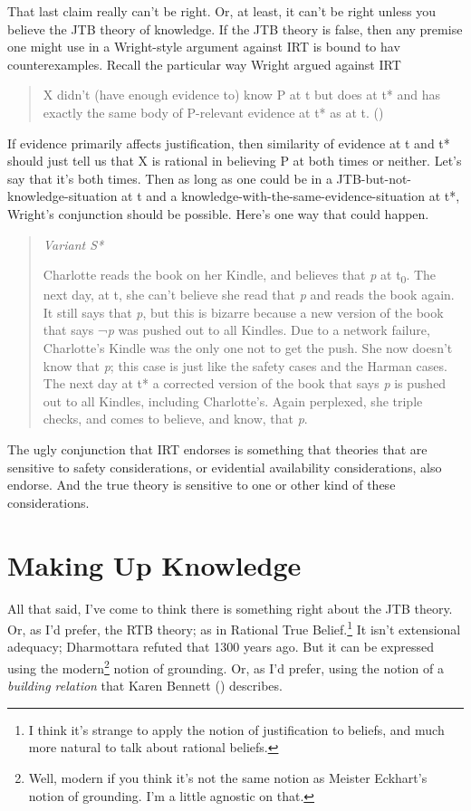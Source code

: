 \documentclass[
  10pt,
  letterpaper,
  twoside]{scrbook}
\begin{document}
That last claim really can't be right. Or, at least, it can't be right
unless you believe the JTB theory of knowledge. If the JTB theory is
false, then any premise one might use in a Wright-style argument against
IRT is bound to hav counterexamples. Recall the particular way Wright
argued against IRT

\begin{quote}
X didn't (have enough evidence to) know P at t but does at t* and has
exactly the same body of P-relevant evidence at t* as at t.
()
\end{quote}

If evidence primarily affects justification, then similarity of evidence
at t and t* should just tell us that X is rational in believing P at
both times or neither. Let's say that it's both times. Then as long as
one could be in a JTB-but-not-knowledge-situation at t and a
knowledge-with-the-same-evidence-situation at t*, Wright's conjunction
should be possible. Here's one way that could happen.

\begin{quote}
\emph{Variant S*}

Charlotte reads the book on her Kindle, and believes that \emph{p} at
t\textsubscript{0}. The next day, at t, she can't believe she read that
\emph{p} and reads the book again. It still says that \emph{p}, but this
is bizarre because a new version of the book that says ¬\emph{p} was
pushed out to all Kindles. Due to a network failure, Charlotte's Kindle
was the only one not to get the push. She now doesn't know that
\emph{p}; this case is just like the safety cases and the Harman cases.
The next day at t* a corrected version of the book that says \emph{p} is
pushed out to all Kindles, including Charlotte's. Again perplexed, she
triple checks, and comes to believe, and know, that \emph{p}.
\end{quote}

The ugly conjunction that IRT endorses is something that theories that
are sensitive to safety considerations, or evidential availability
considerations, also endorse. And the true theory is sensitive to one or
other kind of these considerations.

\section{Making Up Knowledge}\label{sec-building}

All that said, I've come to think there is something right about the JTB
theory. Or, as I'd prefer, the RTB theory; as in Rational True
Belief.\footnote{I think it's strange to apply the notion of
  justification to beliefs, and much more natural to talk about rational
  beliefs.} It isn't extensional adequacy; Dharmottara refuted that 1300
years ago. But it can be expressed using the modern\footnote{Well,
  modern if you think it's not the same notion as Meister Eckhart's
  notion of grounding. I'm a little agnostic on that.} notion of
grounding. Or, as I'd prefer, using the notion of a \emph{building
relation} that Karen Bennett ()
describes.
\end{document}
